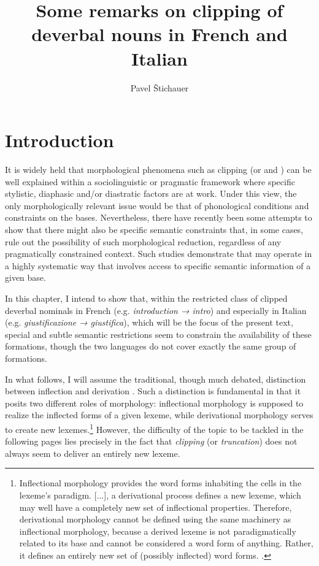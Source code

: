 \documentclass[output=paper]{langsci/langscibook}
\title{Some remarks on clipping of deverbal nouns in French and Italian}
\author{Pavel Štichauer\affiliation{Charles University, Prague}}
\begin{document}

\section{Introduction}\label{Stekauer-introduction}

It is widely held that morphological phenomena such as clipping (or
 and ) can be well explained within a sociolinguistic
or pragmatic framework where specific stylistic, diaphasic and/or
diastratic factors are at work. Under this view, the only
morphologically relevant issue would be that of phonological conditions
and constraints on the bases. Nevertheless, there have recently been 
some attempts to show that there might also be specific semantic
constraints that, in some cases, rule out the possibility of such
morphological reduction, regardless of any pragmatically constrained
context. Such studies demonstrate that  may operate in a
highly systematic way that involves access to specific semantic
information of a given base.

In this chapter, I intend to show that, within the
restricted class of clipped deverbal nominals in French (e.g.
\emph{introduction → intro}) and especially in Italian (e.g.
\emph{giustificazione} \emph{→ giustifica}), which will be the focus of
the present text, special and subtle semantic restrictions seem to
constrain the availability of these formations, though the two languages do not cover
exactly the same group of formations.

In what follows, I will assume the traditional, though much debated,
distinction between inflection and derivation %
\citep[see, e.g.,][38-43]{Spencer13}%
%
. Such a distinction is fundamental in that it posits two
different roles of morphology: inflectional morphology is supposed to
realize the inflected forms of a given lexeme, while derivational
morphology serves to create new lexemes.\footnote{Inflectional
  morphology provides the word forms inhabiting the cells in the
  lexeme's paradigm. {[}...{]}, a derivational process defines a new
  lexeme, which may well have a completely new set of inflectional
  properties. Therefore, derivational morphology cannot be defined using
  the same machinery as inflectional morphology, because a derived
  lexeme is not paradigmatically related to its base and cannot be
  considered a word form of anything. Rather, it defines an entirely new
  set of (possibly inflected) word forms. %
\citep[2]{Spencer13}%
%
.} However,
the difficulty of the topic to be tackled in the following pages lies
precisely in the fact that \emph{clipping} (or \emph{truncation}) does
not always seem to deliver an entirely new lexeme.
\end{document}
